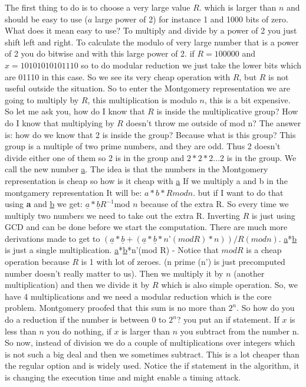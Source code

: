 The first thing to do is to choose a very large value $R$. which is larger than $n$ and should be easy to use ($a$ large power of 2) for instance 1 and 1000 bits of zero. What does it mean easy to use? To multiply and divide by a power of 2 you just shift left and right. To calculate the modulo of very large number that is a power of 2 you do bitwise and with this large power of 2. if $R=100000$ and $x = 10101010101110$ so to do  modular reduction we just take the lower bits which are 01110 in this case. So we see its very cheap operation with $R$, but $R$ is not useful outside the situation. So to enter the Montgomery representation we are going to multiply by $R$, this multiplication is modulo $n$, this is a bit expensive. So let me ask you, how do I know that $R$ is inside the multiplicative group? How do I know that multiplying by $R$ doesn't throw me outside of mod n? The answer is: how do we know that 2 is inside the group? Because what is this group? This group is a multiple of two prime numbers, and they are odd. Thus 2 doesn't divide either one of them so 2 is in the group and \(2*2*2...2\) is in the group. We call the new number \underline{a}. The idea is that the numbers in the Montgomery representation is cheap so how is it cheap with \underline{a} If we multiply a and b in the montgamery representation It will be: \(a*b*R mod n\). but if I want to do that using \textbf{a} and \underline{b} we  get: \(\underline{a}*\underline{b}R^{-1}\)mod $n$ because of the extra R. So every time we multiply two numbers we need to take out the extra R. Inverting $R$ is just using GCD and can be done before we start the computation. There are much more derivations made to get to  \((\underline{a}*\underline{b} + (\underline{a}*\underline{b}*n’(mod R)*n))/R(modn) \). \underline{a}*\underline{b} is just a single multiplication.  \underline{a}*\underline{b}*n’(mod R) - Notice that \(modR\) is a cheap operation because $R$ is 1 with lot of zeroes. (n prime (n') is just precomputed number doesn’t really matter to us). Then we multiply it by $n$ (another multiplication) and then we divide it by $R$ which is also simple operation. So, we have 4 multiplications and we need a modular reduction which is the core problem. Montgomery proofed that this sum is no more than \(2^n\). So how do you do a reduction if the number is between 0 to \(2^n\)? you put an if statement. If $x$ is less than $n$ you do nothing, if $x$ is larger than $n$ you subtract from the number n. So now, instead of division we do a couple of multiplications over integers which is not such a big deal and then we sometimes subtract. This is a lot cheaper than the regular option and is widely used. Notice the if statement in the algorithm, it is changing the execution time and might enable a timing attack.

